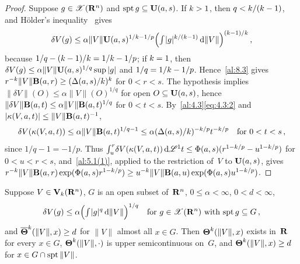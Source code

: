 \begin{proof}
    Suppose $g \in \mathscr{X}(\mathbf{R}^{n})$ and $\operatorname{spt} g \subseteq \mathbf{U}(a,s)$. If $k > 1$, then $q <
    k/(k-1)$, and H\"older's inequality~\cite[2.4.14]{Federer1969} gives
    \begin{displaymath}
        \delta V(g) \le \alpha \|V\| \mathbf{U}(a,s)^{1/k - 1/p} \Big( {\textstyle\int_{}^{}}
        |g|^{k/(k-1)} \,\mathrm{d} \|V\| \Big)^{(k-1)/k} \,,
    \end{displaymath}
    because $1/q - (k-1)/k = 1/k - 1/p$; if $k = 1$, then $\delta V(g) \le \alpha
    \|V\| \mathbf{U}(a,s)^{1/q} \sup |g|$ and $1/q = 1/k - 1/p$. Hence~\ref{al:8.3} gives
    $r^{-k} \|V\| \mathbf{B}(a,r) \ge (\Delta(a,s)/k)^{k}$ for $0 < r < s$. The hypothesis
    implies $\|\delta V\|(O) \le \alpha \|V\|(O)^{1/q}$ for open $O \subseteq \mathbf{U}(a,s)$, hence
    $\|\delta V\| \mathbf{B}(a,t) \le \alpha \|V\| \mathbf{B}(a,t)^{1/q}$ for $0 < t < s$.
    By~\ref{al:4.3}\eqref{eq:4.3:2} and $|\kappa(V,a,t)| \le \|V\| \mathbf{B}(a,t)^{-1}$,
    \begin{displaymath}
        \delta V(\kappa(V,a,t)) \le \alpha \|V\| \mathbf{B}(a,t)^{1/q - 1} \le \alpha
        (\Delta(a,s)/k)^{-k/p} t^{-k/p} \quad \text{for $0 < t < s$} \,,
    \end{displaymath}
    since $1/q - 1 = -1/p$. Thus ${\textstyle\int_{u}^{r}} \delta V(\kappa(V,a,t)) \,\mathrm{d} \mathscr{L}^1 t \le \Phi(a,s)
    (r^{1-k/p} - u^{1-k/p})$ for $0 < u < r < s$, and~\ref{al:5.1(1)}, applied to the
    restriction of~$V$ to $\mathbf{U}(a,s)$, gives $r^{-k} \|V\| \mathbf{B}(a,r) \exp(\Phi(a,s)
    r^{1-k/p}) \ge u^{-k} \|V\| \mathbf{B}(a,u) \exp(\Phi(a,s) u^{1 - k/p})$.
\end{proof}

\begin{theorem}
    \label{al:8.6}
    Suppose $V \in \mathbf{V}_{k}(\mathbf{R}^{n})$, $G$ is an open subset of~$\mathbf{R}^{n}$, $0 \le \alpha <
    \infty$, $0 < d < \infty$,
    \begin{displaymath}
        \delta V(g) \le \alpha \Big( {\textstyle\int_{}^{}} |g|^q \,\mathrm{d} \|V\| \Big)^{1/q} \quad \text{for $g \in
        \mathscr{X}(\mathbf{R}^{n})$ with $\operatorname{spt} g \subseteq G$} \,,
    \end{displaymath}
    and $\boldsymbol{\overline{\Theta}}^{k}(\|V\|,x) \ge d$ for $\|V\|$ almost all $x \in G$. Then
    $\boldsymbol{\Theta}^{k}(\|V\|,x)$ exists in~$\mathbf{R}$ for every $x \in G$, $\boldsymbol{\Theta}^{k}(\|V\|,\cdot)$
    is upper semicontinuous on~$G$, and $\boldsymbol{\Theta}^{k}(\|V\|,x) \ge d$ for $x \in G \cap \operatorname{spt}
    \|V\|$.
\end{theorem}

